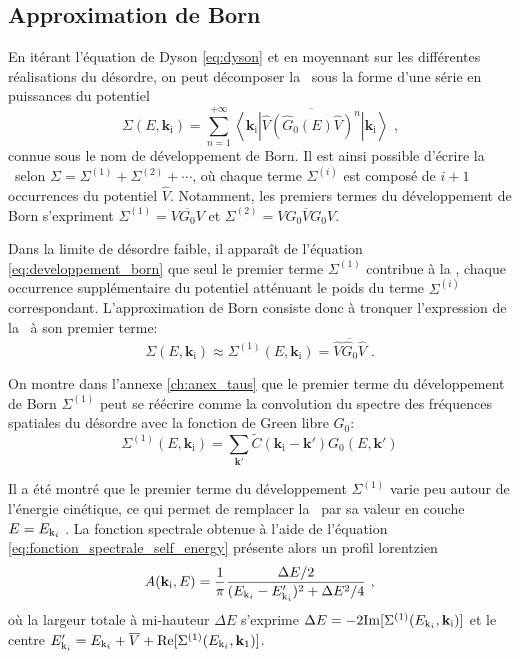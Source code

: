\subsection{Approximation de Born}
En itérant l'équation de Dyson \ref{eq:dyson} et en moyennant sur les différentes réalisations du désordre, on peut décomposer la \selfenergy\ sous la forme d'une série en puissances du potentiel
\begin{equation}
\Sigma(E,\mathbf{k}_{\mathrm{i}}) = \sum_{n=1}^{+\infty}{\overline{\left\langle \mathbf{k}_{\mathrm{i}}\left| \hat{V} \left(\hat{G}_0(E) \hat{V}\right)^n \right|\mathbf{k}_{\mathrm{i}}\right\rangle}} \text{ ,}
\label{eq:developpement_born}
\end{equation}
connue sous le nom de développement de Born. Il est ainsi possible d'écrire la \selfenergy\ selon $\Sigma=\Sigma^{(1)}+\Sigma^{(2)} + \cdots$, où chaque terme $\Sigma^{(i)}$ est composé de $i+1$ occurrences du potentiel $\hat{V}$. Notamment, les premiers termes du développement de Born s'expriment $\Sigma^{(1)}=\overline{V G_0 V}$ et $\Sigma^{(2)}=\overline{V G_0 V G_0 V}$.

Dans la limite de désordre faible, il apparaît de l'équation \ref{eq:developpement_born} que seul le premier terme $\Sigma^{(1)}$ contribue à la \selfenergy , chaque occurrence supplémentaire du potentiel atténuant le poids du terme $\Sigma^{(i)}$ correspondant. L'approximation de Born consiste donc à tronquer l'expression de la \selfenergy\ à son premier terme:
\begin{equation}
\Sigma(E,\mathbf{k}_{\mathrm{i}})\approx \Sigma^{(1)}(E,\mathbf{k}_{\mathrm{i}})=\overline{\hat{V}\hat{G}_0 \hat{V}} \text{ .}
\end{equation}

On montre dans l'annexe \ref{ch:anex_taus} que le premier terme du développement de Born $\Sigma^{(1)}$  peut se réécrire comme la convolution du spectre des fréquences spatiales du désordre avec la fonction de Green libre $G_0$:
\begin{equation}
\Sigma^{(1)}(E,\mathbf{k}_{\mathrm{i}})=\sum_{\mathbf{k}'}{\widetilde{C}(\mathbf{k}_{\mathrm{i}}-\mathbf{k}') G_0(E,\mathbf{k}')}
\end{equation}



Il a été montré que le premier terme du développement $\Sigma^{(1)}$ varie peu autour de l'énergie cinétique, ce qui permet de remplacer la \selfenergy\ par sa valeur en couche $E=E_{\mathrm{k}_i}$ \citep{kuhn2007coherent}. La fonction spectrale obtenue à l'aide de l'équation \ref{eq:fonction_spectrale_self_energy} présente alors un profil lorentzien
\begin{equation}
A(\mathbf{k}_{\mathrm{i}},E)= \frac{1}{\pi} \frac{\Delta E/2}{(E_{\mathrm{k}_i} - E_{\mathrm{k}_i}')^2+\Delta E^2/4} \text{ ,}
\end{equation}
où la largeur totale à mi-hauteur $\Delta E$ s'exprime $\Delta E=-2 \mathrm{Im}[\Sigma^{(1)}(E_{\mathrm{k}_i},\mathbf{k}_{\mathrm{i}})]$ et le centre $E_{\mathrm{k}_i}'=E_{\mathrm{k}_i}+\overline{V}+\mathrm{Re}[\Sigma^{(1)}(E_{\mathrm{k}_i},\mathbf{k}_{\mathrm{1}})]$.

